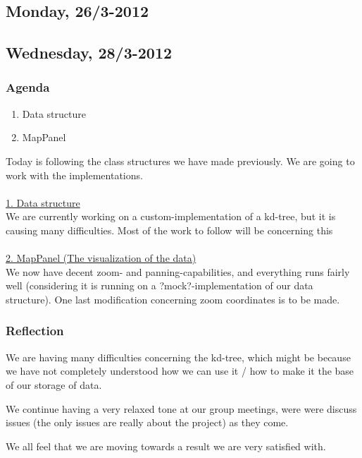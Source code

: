 \documentclass[a4paper,11pt]{article}
\begin{document}
\pagebreak
\subsection{Monday, 26/3-2012}


\pagebreak
\subsection{Wednesday, 28/3-2012}

\subsubsection*{Agenda}
\begin{enumerate}
	\item Data structure
	\item MapPanel
\end{enumerate}
Today is following the class structures we have made previously. We are going to work with the implementations. \\ \\
\underline{1. Data structure} \\
We are currently working on a custom-implementation of a kd-tree, but it is causing many difficulties. Most of the work to follow will be concerning this \\ \\
\underline{2. MapPanel (The visualization of the data)} \\
We now have decent zoom- and panning-capabilities, and everything runs fairly well (considering it is running on a ?mock?-implementation of our data structure). One last modification concerning zoom coordinates is to be made.

\subsubsection*{Reflection}
We are having many difficulties concerning the kd-tree, which might be because we have not completely understood how we can use it / how to make it the base of our storage of data.

We continue having a very relaxed tone at our group meetings, were were discuss issues (the only issues are really about the project) as they come.

We all feel that we are moving towards a result we are very satisfied with.
\end{document}
